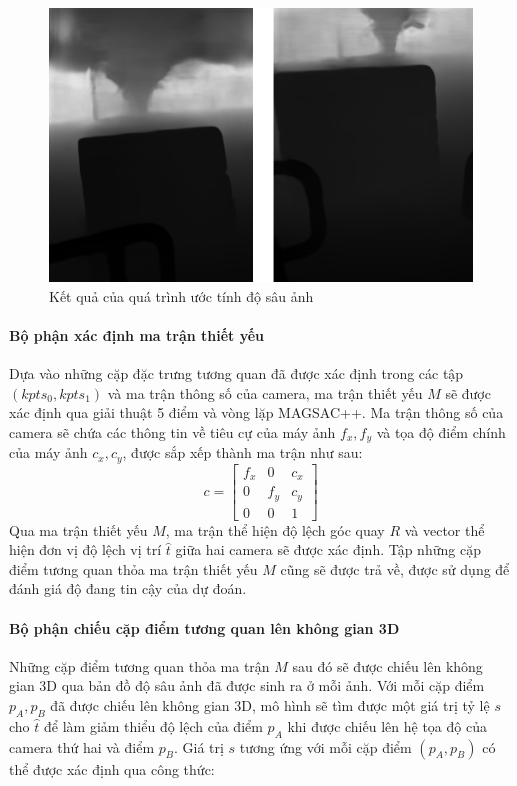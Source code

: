 \begin{figure}[H]
    \centering
    \includegraphics[scale=0.6]{pics/Proposal/depth.png}
    \caption{Kết quả của quá trình ước tính độ sâu ảnh}
\end{figure}

\paragraph*{Bộ phận xác định ma trận thiết yếu}

Dựa vào những cặp đặc trưng tương quan đã được xác định trong các tập $(kpts_0, kpts_1)$ và ma trận thông số của camera, ma trận thiết yếu $M$ sẽ được xác định qua giải thuật 5 điểm và vòng lặp MAGSAC++. Ma trận thông số của camera sẽ chứa các thông tin về tiêu cự của máy ảnh $f_x,f_y$ và tọa độ điểm chính của máy ảnh $c_x,c_y$, được sắp xếp thành ma trận như sau:
$$
c = \begin{bmatrix} f_x & 0 & c_x \\ 0 & f_y & c_y \\ 0 & 0 & 1 \end{bmatrix}
$$ 
Qua ma trận thiết yếu $M$, ma trận thể hiện độ lệch góc quay $R$ và vector thể hiện đơn vị độ lệch vị trí $\hat{t}$ giữa hai camera sẽ được xác định. Tập những cặp điểm tương quan thỏa ma trận thiết yếu $M$ cũng sẽ được trả về, được sử dụng để đánh giá độ đang tin cậy của dự đoán.



\paragraph*{Bộ phận chiếu cặp điểm tương quan lên không gian 3D}

Những cặp điểm tương quan thỏa ma trận $M$ sau đó sẽ được chiếu lên không gian 3D qua bản đồ độ sâu ảnh đã được sinh ra ở mỗi ảnh. Với mỗi cặp điểm $p_A,p_B$ đã được chiếu lên không gian 3D, mô hình sẽ tìm được một giá trị tỷ lệ $s$ cho $\hat{t}$ để làm giảm thiểu độ lệch của điểm $p_A$ khi được chiếu lên hệ tọa độ của camera thứ hai và điểm $p_B$. Giá trị $s$ tương ứng với mỗi cặp điểm $(p_A,p_B)$ có thể được xác định qua công thức:


